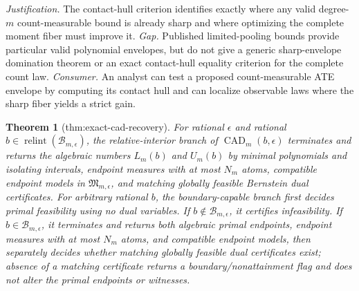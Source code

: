 \documentclass{article}
\newtheorem{theorem}{Theorem}
\begin{document}
\par\smallskip\noindent \textit{Justification.} The contact-hull criterion identifies exactly where any valid degree-\(m\) count-measurable bound is already sharp and where optimizing the complete moment fiber must improve it. \textit{Gap.} Published limited-pooling bounds provide particular valid polynomial envelopes, but do not give a generic sharp-envelope domination theorem or an exact contact-hull equality criterion for the complete count law. \textit{Consumer.} An analyst can test a proposed count-measurable ATE envelope by computing its contact hull and can localize observable laws where the sharp fiber yields a strict gain.

\begin{theorem}[thm:exact-cad-recovery]\label{thm:exact-cad-recovery}
For rational \(\epsilon\) and rational \(b\in\operatorname{relint}(\mathcal B_{m,\epsilon})\), the relative-interior branch of \(\operatorname{CAD}_m(b,\epsilon)\) terminates and returns the algebraic numbers \(L_m(b)\) and \(U_m(b)\) by minimal polynomials and isolating intervals, endpoint measures with at most \(N_m\) atoms, compatible endpoint models in \(\mathfrak M_{m,\epsilon}\), and matching globally feasible Bernstein dual certificates. For arbitrary rational \(b\), the boundary-capable branch first decides primal feasibility using no dual variables. If \(b\notin\mathcal B_{m,\epsilon}\), it certifies infeasibility. If \(b\in\mathcal B_{m,\epsilon}\), it terminates and returns both algebraic primal endpoints, endpoint measures with at most \(N_m\) atoms, and compatible endpoint models, then separately decides whether matching globally feasible dual certificates exist; absence of a matching certificate returns a boundary/nonattainment flag and does not alter the primal endpoints or witnesses.
\end{theorem}
\end{document}
